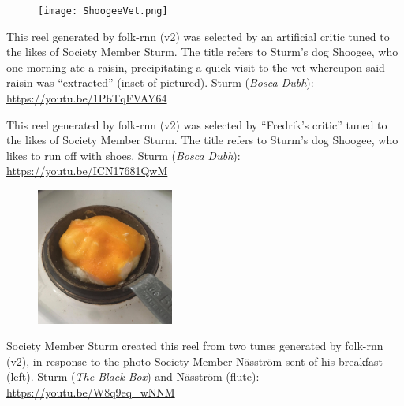 \documentclass[a4paper,notitlepage,twoside]{book}
\begin{document}
{}  
  
\hypertarget{reel:DogRaisin}{}
\begin{figure}
\texttt{[image: ShoogeeVet.png]}
\end{figure}
This reel generated by folk-rnn (v2) was selected by an artificial critic 
tuned to the likes of Society Member Sturm.
The title refers to Sturm's dog Shoogee,
who one morning ate a raisin, 
precipitating a quick visit to the vet
whereupon said raisin was ``extracted'' (inset of pictured).
Sturm ({\em Bosca Dubh}): \url{https://youtu.be/1PbTqFVAY64}

\clearpage
{}
{}  
  
\hypertarget{reel:ShoogeeTakeAnotherShoe}{}
This reel generated by folk-rnn (v2) was selected by ``Fredrik's critic'' 
tuned to the likes of Society Member Sturm.
The title refers to Sturm's dog Shoogee,
who likes to run off with shoes. 
Sturm ({\em Bosca Dubh}): \url{https://youtu.be/ICN17681QwM}

{}  
  
\hypertarget{reel:DresstheEggwithaHat}{}
\begin{figure}
\vspace{-0.3in}
\includegraphics[width=0.4\textwidth]{eggwithahat.jpg}
\end{figure}
Society Member Sturm created this reel from 
two tunes generated by folk-rnn (v2),
in response to the photo Society Member Näsström
sent of his breakfast (left).
Sturm ({\em The Black Box}) and Näsström (flute): \url{https://youtu.be/W8q9eq_wNNM}
\clearpage
\end{document}
